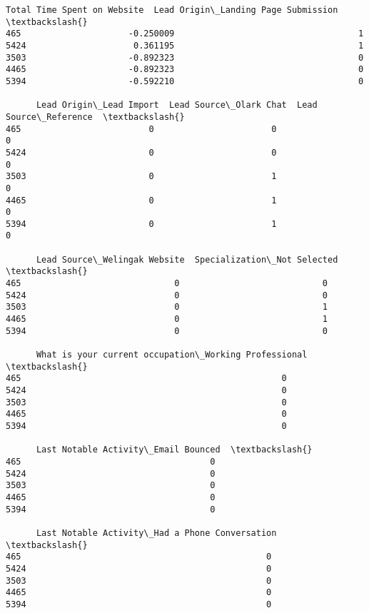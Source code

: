 \documentclass[11pt]{article}
\makeatletter
\newcommand{\boxspacing}{\kern\kvtcb@left@rule\kern\kvtcb@boxsep}
\newcommand{\prompt}[4]{
        \ttfamily\llap{{\color{#2}[#3]:\hspace{3pt}#4}}\vspace{-\baselineskip}
    }
\makeatother
\begin{document}
            \begin{tcolorbox}[breakable, size=fbox, boxrule=.5pt, pad at break*=1mm, opacityfill=0]
\prompt{Out}{outcolor}{109}{\boxspacing}
\begin{Verbatim}[commandchars=\\\{\}]
      Total Time Spent on Website  Lead Origin\_Landing Page Submission  \textbackslash{}
465                     -0.250009                                    1
5424                     0.361195                                    1
3503                    -0.892323                                    0
4465                    -0.892323                                    0
5394                    -0.592210                                    0

      Lead Origin\_Lead Import  Lead Source\_Olark Chat  Lead Source\_Reference  \textbackslash{}
465                         0                       0                      0
5424                        0                       0                      0
3503                        0                       1                      0
4465                        0                       1                      0
5394                        0                       1                      0

      Lead Source\_Welingak Website  Specialization\_Not Selected  \textbackslash{}
465                              0                            0
5424                             0                            0
3503                             0                            1
4465                             0                            1
5394                             0                            0

      What is your current occupation\_Working Professional  \textbackslash{}
465                                                   0
5424                                                  0
3503                                                  0
4465                                                  0
5394                                                  0

      Last Notable Activity\_Email Bounced  \textbackslash{}
465                                     0
5424                                    0
3503                                    0
4465                                    0
5394                                    0

      Last Notable Activity\_Had a Phone Conversation  \textbackslash{}
465                                                0
5424                                               0
3503                                               0
4465                                               0
5394                                               0


\end{Verbatim}
\end{tcolorbox}
\end{document}
